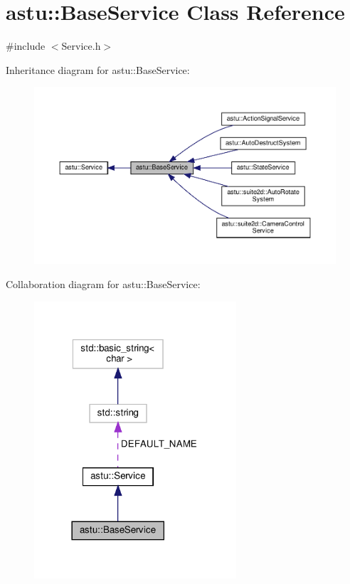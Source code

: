 \hypertarget{classastu_1_1BaseService}{}\section{astu\+:\+:Base\+Service Class Reference}
\label{classastu_1_1BaseService}


{\ttfamily \#include $<$Service.\+h$>$}



Inheritance diagram for astu\+:\+:Base\+Service\+:
\nopagebreak
\begin{figure}[H]
\begin{center}
\leavevmode
\includegraphics[width=350pt]{classastu_1_1BaseService__inherit__graph}
\end{center}
\end{figure}


Collaboration diagram for astu\+:\+:Base\+Service\+:
\nopagebreak
\begin{figure}[H]
\begin{center}
\leavevmode
\includegraphics[width=213pt]{classastu_1_1BaseService__coll__graph}
\end{center}
\end{figure}
